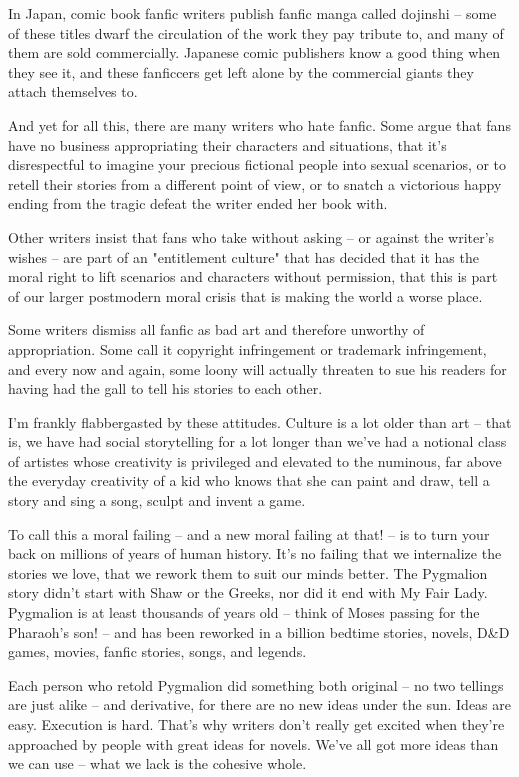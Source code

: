 In Japan, comic book fanfic writers publish fanfic manga called
dojinshi -- some of these titles dwarf the circulation of the work
they pay tribute to, and many of them are sold commercially.
Japanese comic publishers know a good thing when they see it, and
these fanficcers get left alone by the commercial giants they
attach themselves to.

And yet for all this, there are many writers who hate fanfic. Some
argue that fans have no business appropriating their characters and
situations, that it's disrespectful to imagine your precious
fictional people into sexual scenarios, or to retell their stories
from a different point of view, or to snatch a victorious happy
ending from the tragic defeat the writer ended her book with.

Other writers insist that fans who take without asking -- or
against the writer's wishes -- are part of an "entitlement culture"
that has decided that it has the moral right to lift scenarios and
characters without permission, that this is part of our larger
postmodern moral crisis that is making the world a worse place.

Some writers dismiss all fanfic as bad art and therefore unworthy
of appropriation. Some call it copyright infringement or trademark
infringement, and every now and again, some loony will actually
threaten to sue his readers for having had the gall to tell his
stories to each other.

I'm frankly flabbergasted by these attitudes. Culture is a lot
older than art -- that is, we have had social storytelling for a
lot longer than we've had a notional class of artistes whose
creativity is privileged and elevated to the numinous, far above
the everyday creativity of a kid who knows that she can paint and
draw, tell a story and sing a song, sculpt and invent a game.

To call this a moral failing -- and a new moral failing at that! --
is to turn your back on millions of years of human history. It's no
failing that we internalize the stories we love, that we rework
them to suit our minds better. The Pygmalion story didn't start
with Shaw or the Greeks, nor did it end with My Fair Lady.
Pygmalion is at least thousands of years old -- think of Moses
passing for the Pharaoh's son! -- and has been reworked in a
billion bedtime stories, novels, D\&D games, movies, fanfic
stories, songs, and legends.

Each person who retold Pygmalion did something both original -- no
two tellings are just alike -- and derivative, for there are no new
ideas under the sun. Ideas are easy. Execution is hard. That's why
writers don't really get excited when they're approached by people
with great ideas for novels. We've all got more ideas than we can
use -- what we lack is the cohesive whole.

